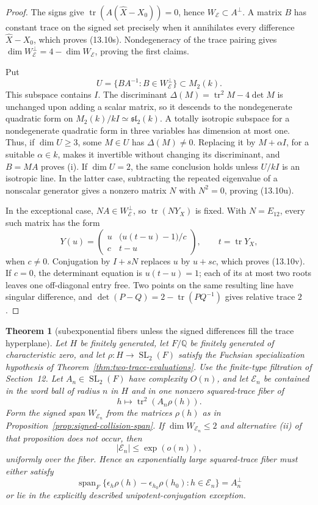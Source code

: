 \documentclass[11pt,reqno]{amsart}
\newtheorem{theorem}{Theorem}[section]
\theoremstyle{definition}
\theoremstyle{remark}
\newcommand{\Q}{\mathbb Q}
\newcommand{\Tr}{\operatorname{tr}}
\newcommand{\Span}{\operatorname{span}}
\newcommand{\SL}{\operatorname{SL}}
\begin{document}
\begin{proof}
The signs give \(\Tr(A(\widehat X-X_0))=0\), hence
\(W_{\mathcal E}\subset A^\perp\).  A matrix \(B\) has constant trace on
the signed set precisely when it annihilates every difference
\(\widehat X-X_0\), which proves (13.10s).  Nondegeneracy of the trace
pairing gives
\(\dim W_{\mathcal E}^\perp=4-\dim W_{\mathcal E}\), proving the first
claims.

Put
\[
 U=\{BA^{-1}:B\in W_{\mathcal E}^\perp\}\subset M_2(k).
\]
This subspace contains \(I\).  The discriminant
\(\Delta(M)=\Tr^2M-4\det M\) is unchanged upon adding a scalar matrix, so
it descends to the nondegenerate quadratic form on
\(M_2(k)/kI\simeq\mathfrak{sl}_2(k)\).  A totally isotropic subspace for
a nondegenerate quadratic form in three variables has dimension at most
one.  Thus, if \(\dim U\ge3\), some \(M\in U\) has
\(\Delta(M)\ne0\).  Replacing it by \(M+\alpha I\), for a suitable
\(\alpha\in k\), makes it invertible without changing its discriminant,
and \(B=MA\) proves \textup{(i)}.  If \(\dim U=2\), the same conclusion
holds unless \(U/kI\) is an isotropic line.  In the latter case,
subtracting the repeated eigenvalue of a nonscalar generator gives a
nonzero matrix \(N\) with \(N^2=0\), proving (13.10u).

In the exceptional case, \(NA\in W_{\mathcal E}^\perp\), so
\(\Tr(NY_X)\) is fixed.  With \(N=E_{12}\), every such matrix has the form
\[
 Y(u)=
 \begin{pmatrix}
  u&\bigl(u(t-u)-1\bigr)/c\\ c&t-u
 \end{pmatrix},
 \qquad t=\Tr Y_X,
\]
when \(c\ne0\).  Conjugation by \(I+sN\) replaces \(u\) by \(u+sc\),
which proves (13.10v).  If \(c=0\), the determinant equation is
\(u(t-u)=1\); each of its at most two roots leaves one off-diagonal entry
free.  Two points on the same resulting line have singular difference,
and
\(\det(P-Q)=2-\Tr(PQ^{-1})\) gives relative trace \(2\).
\end{proof}

\begin{theorem}[subexponential fibers unless the signed differences fill the trace hyperplane]
\label{thm:collision-span-fiber-bound}
Let \(H\) be finitely generated, let \(F/\Q\) be finitely generated of
characteristic zero, and let \(\rho\colon H\to\SL_2(F)\) satisfy the
Fuchsian specialization hypothesis of
Theorem~\ref{thm:two-trace-evaluations}.  Use the finite-type filtration of
Section~12.  Let \(A_n\in\SL_2(F)\) have complexity \(O(n)\), and let
\(\mathcal E_n\) be contained in the word ball of radius \(n\) in \(H\)
and in one nonzero squared-trace fiber of
\[
 h\longmapsto\Tr^2(A_n\rho(h)).
\]
Form the signed span \(W_{\mathcal E_n}\) from the matrices
\(\rho(h)\) as in Proposition~\ref{prop:signed-collision-span}.  If
\(\dim W_{\mathcal E_n}\le2\) and alternative \textup{(ii)} of that
proposition does not occur, then
\[
 |\mathcal E_n|\le\exp(o(n)),
\]
uniformly over the fiber.  Hence an exponentially large squared-trace
fiber must either satisfy
\[
 \Span_F\{\epsilon_h\rho(h)-\epsilon_{h_0}\rho(h_0):
                 h\in\mathcal E_n\}=A_n^\perp
\tag{13.10w}
\]
or lie in the explicitly described unipotent-conjugation exception.
\end{theorem}
\end{document}
